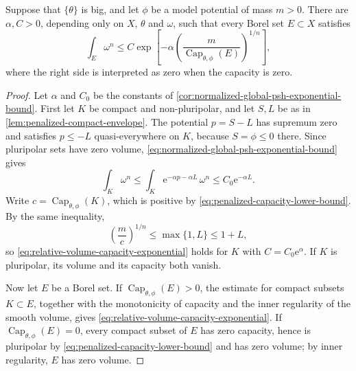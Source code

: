 \begin{proposition}\label{prop:relative-volume-capacity-exponential}
Suppose that $\{\theta\}$ is big, and let $\phi$ be a model potential of mass $m>0$. There are $\alpha,C>0$, depending only on $X$, $\theta$ and $\omega$, such that every Borel set $E\subset X$ satisfies
\begin{equation}\label{eq:relative-volume-capacity-exponential}
 \int_E\omega^n\leq C\exp\left[-\alpha
       \left(\frac{m}{\operatorname{Cap}_{\theta,\phi}(E)}\right)^{1/n}\right],
\end{equation}
where the right side is interpreted as zero when the capacity is zero.
\end{proposition}
\begin{proof}
Let $\alpha$ and $C_0$ be the constants of \cref{cor:normalized-global-psh-exponential-bound}. First let $K$ be compact and non-pluripolar, and let $S,L$ be as in \cref{lem:penalized-compact-envelope}. The potential $p=S-L$ has supremum zero and satisfies $p\leq-L$ quasi-everywhere on $K$, because $S=\phi\leq0$ there. Since pluripolar sets have zero volume, \eqref{eq:normalized-global-psh-exponential-bound} gives
\[
 \int_K\omega^n\leq\int_K\mathrm e^{-\alpha p-\alpha L}\,\omega^n\leq C_0\mathrm e^{-\alpha L}.
\]
Write $c=\operatorname{Cap}_{\theta,\phi}(K)$, which is positive by \eqref{eq:penalized-capacity-lower-bound}. By the same inequality,
\[
 \left(\frac mc\right)^{1/n}\leq\max\{1,L\}\leq1+L,
\]
so \eqref{eq:relative-volume-capacity-exponential} holds for $K$ with $C=C_0\mathrm e^\alpha$. If $K$ is pluripolar, its volume and its capacity both vanish.

Now let $E$ be a Borel set. If $\operatorname{Cap}_{\theta,\phi}(E)>0$, the estimate for compact subsets $K\subset E$, together with the monotonicity of capacity and the inner regularity of the smooth volume, gives \eqref{eq:relative-volume-capacity-exponential}. If $\operatorname{Cap}_{\theta,\phi}(E)=0$, every compact subset of $E$ has zero capacity, hence is pluripolar by \eqref{eq:penalized-capacity-lower-bound} and has zero volume; by inner regularity, $E$ has zero volume.
\end{proof}

